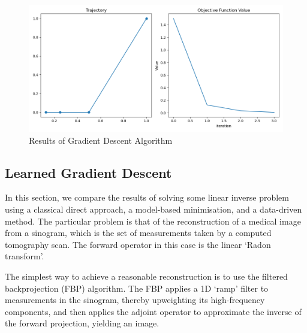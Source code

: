 \documentclass[12pt]{article}
\begin{document}
\begin{figure}[htp]
    \includegraphics[scale=0.5]{figures/gradient_descent.png}
    \caption{Results of Gradient Descent Algorithm}
    \label{fig:gradient_descent}
\end{figure}

\subsection{Learned Gradient Descent}

In this section, we compare the results of solving some linear inverse problem using a classical direct approach,
a model-based minimisation, and a data-driven method.
The particular problem is that of the reconstruction of a medical image from a sinogram,
which is the set of measurements taken by a computed tomography scan.
The forward operator in this case is the linear `Radon transform'.

The simplest way to achieve a reasonable reconstruction is to use the filtered backprojection (FBP) algorithm.
The FBP applies a 1D `ramp' filter to measurements in the sinogram,
thereby upweighting its high-frequency components,
and then applies the adjoint operator to approximate the inverse of the forward projection,
yielding an image.
\end{document}
